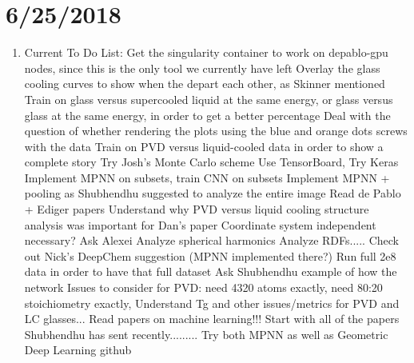 \documentclass[12pt,reqno]{amsart}
\numberwithin{equation}{section}
\begin{document}
\section{6/25/2018}
\begin{enumerate}
\item Current To Do List:
\subitem Get the singularity container to work on depablo-gpu nodes, since this is the only tool we currently have left  
\subitem Overlay the glass cooling curves to show when the depart each other, as Skinner mentioned
\subitem Train on glass versus supercooled liquid at the same energy, or glass versus glass at the same energy, in order to get a better percentage
\subitem Deal with the question of whether rendering the plots using the blue and orange dots screws with the data
\subitem Train on PVD versus liquid-cooled data in order to show a complete story
\subitem Try Josh's Monte Carlo scheme 
\subitem Use TensorBoard, Try Keras
\subitem Implement MPNN on subsets, train CNN on subsets
\subitem Implement MPNN + pooling as Shubhendhu suggested to analyze the entire image 
\subitem Read de Pablo + Ediger papers
\subitem Understand why PVD versus liquid cooling structure analysis was important for Dan's paper
\subitem Coordinate system independent necessary?  Ask Alexei 
\subitem Analyze spherical harmonics
\subitem Analyze RDFs.....
\subitem Check out Nick's DeepChem suggestion (MPNN implemented there?)
\subitem Run full 2e8 data in order to have that full dataset
\subitem Ask Shubhendhu example of how the network
\subitem Issues to consider for PVD: need 4320 atoms exactly, need 80:20 stoichiometry exactly, 
\subitem Understand Tg and other issues/metrics for PVD and LC glasses...
\subitem Read papers on machine learning!!! Start with all of the papers Shubhendhu has sent recently.........
\subitem Try both MPNN as well as Geometric Deep Learning github



\end{enumerate}
\end{document}
